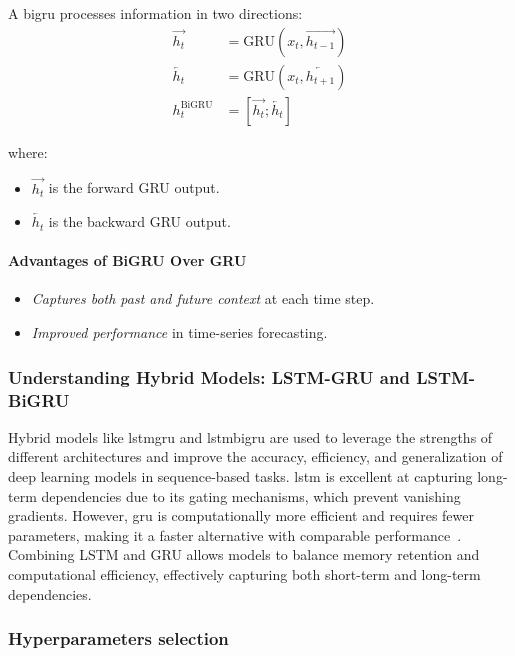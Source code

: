 A \acrshort{bigru} processes information in two directions:
\begin{align}
\overrightarrow{h_t} &= \text{GRU}(x_t, \overrightarrow{h_{t-1}}) \\
\overleftarrow{h_t} &= \text{GRU}(x_t, \overleftarrow{h_{t+1}}) \\
h_t^{\text{BiGRU}} &= [\overrightarrow{h_t}; \overleftarrow{h_t}]
\end{align}

where:
\begin{itemize}
\item $\overrightarrow{h_t}$ is the forward GRU output.
\item $\overleftarrow{h_t}$ is the backward GRU output.
\end{itemize}

\paragraph{Advantages of BiGRU Over GRU}

\begin{itemize}
\item \emph{Captures both past and future context} at each time step.
\item \emph{Improved performance} in time-series forecasting.
\end{itemize}

\subsubsection{Understanding Hybrid Models: LSTM-GRU and LSTM-BiGRU}

Hybrid models like \acrshort{lstmgru} and \acrshort{lstmbigru} are used to leverage the strengths of
different architectures and improve the 
accuracy, efficiency, and generalization of deep learning models in sequence-based tasks. \acrshort{lstm} is excellent at 
capturing long-term dependencies due to its gating mechanisms, which prevent vanishing gradients. However, \acrshort{gru} 
is computationally more efficient and requires fewer parameters, making it a faster alternative with comparable 
performance~\parencite{phuoc2024StockPrediction}. Combining LSTM and GRU allows models to balance memory retention and computational
efficiency, effectively capturing both short-term and long-term dependencies.

\subsubsection{Hyperparameters selection}

